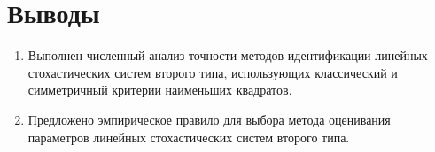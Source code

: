 \section{Выводы}

\begin{enumerate}
\item Выполнен численный анализ точности методов идентификации линейных
  стохастических систем второго типа, использующих классический и
  симметричный критерии наименьших квадратов.
\item Предложено эмпирическое правило для выбора метода
  оценивания параметров линейных стохастических систем второго типа.
\end{enumerate}
